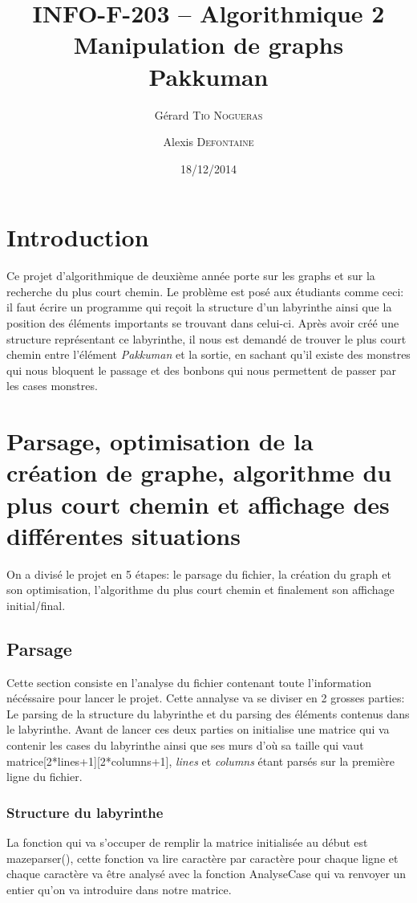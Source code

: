 \documentclass[12pt, oneside]{article}
\title{{\normalsize{INFO-F-203 -- Algorithmique 2}}\\Manipulation de graphs\\ Pakkuman}
\author{Gérard \textsc{Tio Nogueras} \and Alexis \textsc{Defontaine}}
\date{18/12/2014}
\begin{document}
\maketitle

\section{Introduction}
Ce projet d'algorithmique de deuxième année porte sur les graphs et sur la recherche du plus court chemin.
Le problème est posé aux étudiants comme ceci: il faut écrire un programme qui reçoit la structure d'un labyrinthe ainsi que la position des éléments importants se trouvant dans celui-ci. 
Après avoir créé une structure représentant ce labyrinthe, il nous est demandé de trouver le plus court chemin entre l'élément \emph{Pakkuman} et la sortie, en sachant qu'il existe des monstres qui nous bloquent le passage et des bonbons qui nous permettent de passer par les cases monstres.
\section{Parsage, optimisation de la création de graphe, algorithme du plus court chemin et affichage des différentes situations}
On a divisé le projet en 5 étapes: le parsage du fichier, la création du graph et son optimisation, l'algorithme du plus court chemin et finalement son affichage initial/final.
\subsection{Parsage}
Cette section consiste en l'analyse du fichier contenant toute l'information nécéssaire pour lancer le projet. Cette annalyse va se diviser en 2 grosses parties: Le parsing de la structure du labyrinthe et du parsing des éléments contenus dans le labyrinthe. Avant de lancer ces deux parties on initialise une matrice qui va contenir les cases du labyrinthe  ainsi que ses murs d'où sa taille qui vaut matrice[2*lines+1][2*columns+1], \emph{lines} et \emph{columns} étant parsés sur la première ligne du fichier. 
 
\subsubsection{Structure du labyrinthe}
La fonction qui va s'occuper de remplir la matrice initialisée au début est maze\textunderscore parser(), cette fonction va lire caractère par caractère pour chaque ligne et chaque caractère va être analysé avec la fonction Analyse\textunderscore Case qui va renvoyer un entier qu'on va introduire dans notre matrice.
\end{document}

